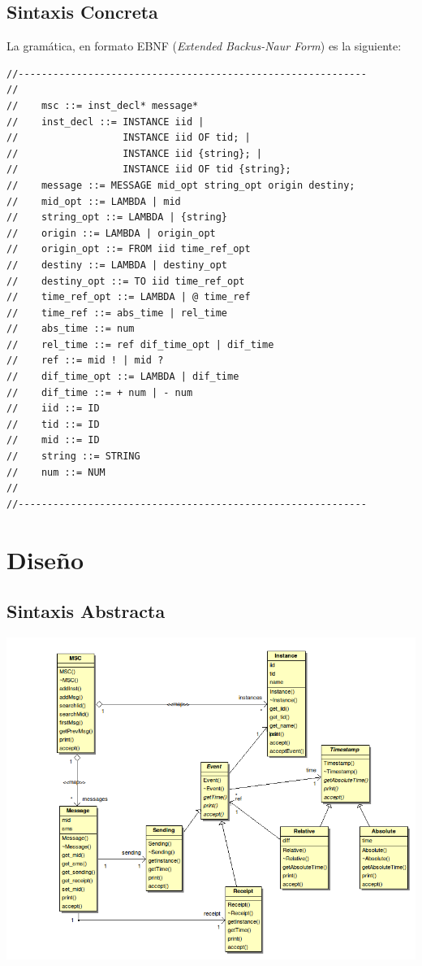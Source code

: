 \documentclass[12pt,a4paper]{report}
\newcommand{\lstsetocl}{
  \lstset{
    language=OCL,
    style=spec,
  }
}
\begin{document}
\section{Sintaxis Concreta}

La gramática, en formato EBNF (\emph{Extended Backus-Naur Form}) es la siguiente:
\begin{verbatim}
//------------------------------------------------------------
//    
//    msc ::= inst_decl* message*
//    inst_decl ::= INSTANCE iid |
//                  INSTANCE iid OF tid; |
//                  INSTANCE iid {string}; |
//                  INSTANCE iid OF tid {string};               
//    message ::= MESSAGE mid_opt string_opt origin destiny;
//    mid_opt ::= LAMBDA | mid
//    string_opt ::= LAMBDA | {string}
//    origin ::= LAMBDA | origin_opt
//    origin_opt ::= FROM iid time_ref_opt
//    destiny ::= LAMBDA | destiny_opt
//    destiny_opt ::= TO iid time_ref_opt
//    time_ref_opt ::= LAMBDA | @ time_ref
//    time_ref ::= abs_time | rel_time
//    abs_time ::= num
//    rel_time ::= ref dif_time_opt | dif_time
//    ref ::= mid ! | mid ?
//    dif_time_opt ::= LAMBDA | dif_time
//    dif_time ::= + num | - num
//    iid ::= ID
//    tid ::= ID
//    mid ::= ID
//    string ::= STRING
//    num ::= NUM
//
//------------------------------------------------------------
\end{verbatim}

\chapter{Diseño}
\label{ch:diseno}

\section{Sintaxis Abstracta}
\lstsetocl

\includegraphics[scale=0.5]{./images/fig2}
\end{document}
